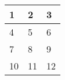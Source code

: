 \begin{table}[]
\begin{tabular}{|l|l|l|}
\hline
1 & 2 & 3 \\ \hline
4 & 5 & 6 \\ \hline
7 & 8 & 9 \\ \hline
10 & 11 & 12 \\ \hline
\end{tabular}
\end{table}
